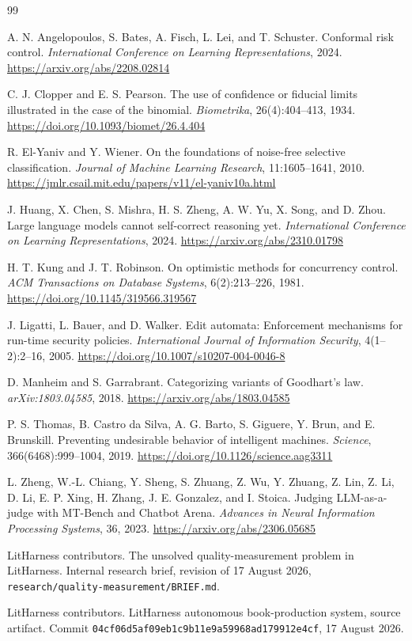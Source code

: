 \documentclass[11pt]{article}
\newcommand{\code}[1]{\texttt{#1}}
\begin{document}
\begin{thebibliography}{99}

A. N. Angelopoulos, S. Bates, A. Fisch, L. Lei, and T. Schuster.
Conformal risk control.
\emph{International Conference on Learning Representations}, 2024.
\url{https://arxiv.org/abs/2208.02814}

C. J. Clopper and E. S. Pearson.
The use of confidence or fiducial limits illustrated in the case of the binomial.
\emph{Biometrika}, 26(4):404--413, 1934.
\url{https://doi.org/10.1093/biomet/26.4.404}

R. El-Yaniv and Y. Wiener.
On the foundations of noise-free selective classification.
\emph{Journal of Machine Learning Research}, 11:1605--1641, 2010.
\url{https://jmlr.csail.mit.edu/papers/v11/el-yaniv10a.html}

J. Huang, X. Chen, S. Mishra, H. S. Zheng, A. W. Yu, X. Song, and D. Zhou.
Large language models cannot self-correct reasoning yet.
\emph{International Conference on Learning Representations}, 2024.
\url{https://arxiv.org/abs/2310.01798}

H. T. Kung and J. T. Robinson.
On optimistic methods for concurrency control.
\emph{ACM Transactions on Database Systems}, 6(2):213--226, 1981.
\url{https://doi.org/10.1145/319566.319567}

J. Ligatti, L. Bauer, and D. Walker.
Edit automata: Enforcement mechanisms for run-time security policies.
\emph{International Journal of Information Security}, 4(1--2):2--16, 2005.
\url{https://doi.org/10.1007/s10207-004-0046-8}

D. Manheim and S. Garrabrant.
Categorizing variants of Goodhart's law.
\emph{arXiv:1803.04585}, 2018.
\url{https://arxiv.org/abs/1803.04585}

P. S. Thomas, B. Castro da Silva, A. G. Barto, S. Giguere, Y. Brun, and E. Brunskill.
Preventing undesirable behavior of intelligent machines.
\emph{Science}, 366(6468):999--1004, 2019.
\url{https://doi.org/10.1126/science.aag3311}

L. Zheng, W.-L. Chiang, Y. Sheng, S. Zhuang, Z. Wu, Y. Zhuang, Z. Lin, Z. Li,
D. Li, E. P. Xing, H. Zhang, J. E. Gonzalez, and I. Stoica.
Judging LLM-as-a-judge with MT-Bench and Chatbot Arena.
\emph{Advances in Neural Information Processing Systems}, 36, 2023.
\url{https://arxiv.org/abs/2306.05685}

LitHarness contributors.
The unsolved quality-measurement problem in LitHarness.
Internal research brief, revision of 17 August 2026,
\code{research/quality-measurement/BRIEF.md}.

LitHarness contributors.
LitHarness autonomous book-production system, source artifact.
Commit \code{04cf06d5af09eb1c9b11e9a59968ad179912e4cf}, 17 August 2026.

\end{thebibliography}
\end{document}
